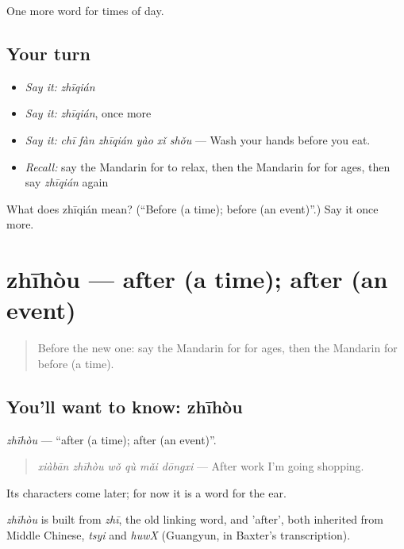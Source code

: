 \begin{grammarlens}[title={What you've built}]
One more word for times of day.
\end{grammarlens}

\subsection*{Your turn}
\begin{itemize}
\raggedright
  \item \emph{Say it:} \emph{zhīqián}
  \item \emph{Say it:} \emph{zhīqián}, once more
  \item \emph{Say it:} \emph{chī fàn zhīqián yào xǐ shǒu} — Wash your hands before you eat.
  \item \emph{Recall:} say the Mandarin for to relax, then the Mandarin for for ages, then say \emph{zhīqián} again
\end{itemize}

\begin{tcolorbox}[breakable,colback=teal!4,colframe=teal!35!black,title={Before you move on}]
What does zhīqián mean? (\textquotedblleft{}Before (a time); before (an event)\textquotedblright{}.) Say it once more.
\end{tcolorbox}
\section[zhīhòu]{zhīhòu — after (a time); after (an event)}

\label{lesson:ZH-C185-zhihou}



\begin{quote}
Before the new one: say the Mandarin for for ages, then the Mandarin for before (a time).
\end{quote}

\subsection*{You'll want to know: zhīhòu}
\emph{zhīhòu} — \textquotedblleft{}after (a time); after (an event)\textquotedblright{}.

\begin{quote}
\emph{xiàbān zhīhòu wǒ qù mǎi dōngxi} — After work I'm going shopping.
\end{quote}

Its characters come later; for now it is a word for the ear.

\begin{cousinweb}
\emph{zhīhòu} is built from \emph{zhī}, the old linking word, and  'after', both inherited from Middle Chinese, \emph{tsyi} and \emph{huwX} (Guangyun, in Baxter's transcription).
\end{cousinweb}

